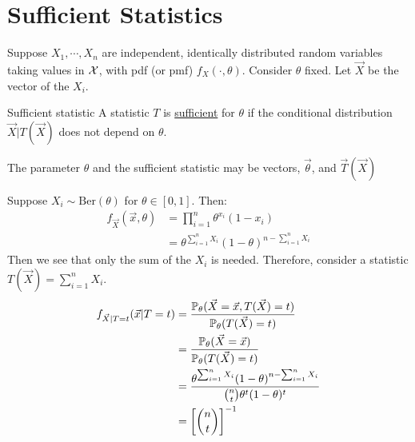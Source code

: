 \documentclass[../Main.tex]{subfiles}
\begin{document}
\section{Sufficient Statistics}
Suppose $X_1, \cdots, X_n$ are independent, identically distributed random variables taking values in $\samplespace$, with pdf (or pmf) $f_X(\cdot, \theta)$. Consider $\theta$ fixed. Let $\vec{X}$ be the vector of the $X_i$.
\begin{definition}{Sufficient statistic}
    A statistic $T$ is \underline{sufficient} for $\theta$ if the conditional distribution $\vec{X} | T(\vec{X})$ does not depend on $\theta$.
\end{definition}
\begin{remark}
    The parameter $\theta$ and the sufficient statistic may be vectors, $\vec{\theta}$, and $\vec{T}(\vec{X})$
\end{remark}
\begin{example}
    Suppose $X_i \sim \text{Ber}(\theta)$ for $\theta \in [0, 1]$. Then:
    \begin{align*}
        f_{\vec{X}}(\vec{x}, \theta) &= \prod_{i=1}^{n} \theta^{x_i}(1 - x_i) \\
        &= \theta^{\sum_{i=1}^n X_i} (1 - \theta)^{n - \sum_{i=1}^n X_i}
    \end{align*}
    Then we see that only the sum of the $X_i$ is needed. Therefore, consider a statistic $T(\vec{X}) = \sum_{i=1}^n X_i$.
    \begin{align*}
        f_{\vec{X} | T = t}(\vec{x} | T = t) &= \frac{\P_\theta(\vec{X} = \vec{x}, T(\vec{X}) = t)}{\P_\theta(T(\vec{X}) = t)} \\
        &= \frac{\P_\theta(\vec{X} = \vec{x})}{\P_\theta(T(\vec{X}) = t)} \\
        &= \frac{\theta^{\sum_{i=1}^n X_i} (1-\theta)^{n-\sum_{i=1}^n X_i}}{\binom{n}{t} \theta^t (1 - \theta)^t} \\
        &= \left[\binom{n}{t}\right]^{-1}
    \end{align*}
    \label{expBerSuffStat}
\end{example}
\end{document}
